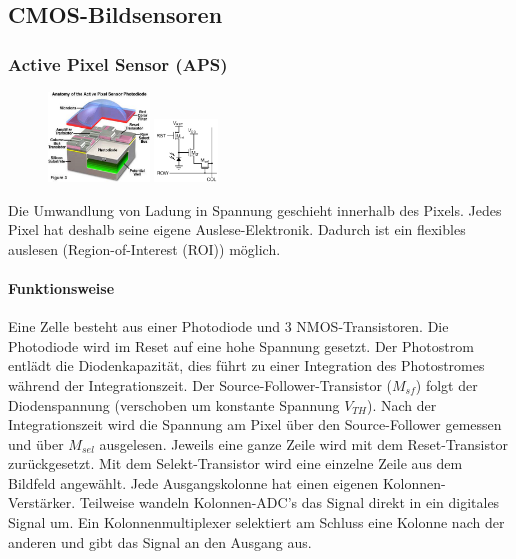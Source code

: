 \subsection{CMOS-Bildsensoren}
\subsubsection{Active Pixel Sensor (APS)}
\begin{figure}
    \centering
    \includegraphics[width=0.24\textwidth]{images/cmos_aps}
    \includegraphics[width=0.15\textwidth]{images/cmos_aps_aufbau}
\end{figure}
Die Umwandlung von Ladung in Spannung geschieht innerhalb des Pixels. Jedes Pixel hat deshalb seine eigene Auslese-Elektronik. Dadurch ist ein flexibles auslesen (Region-of-Interest (ROI)) möglich. 
\paragraph{Funktionsweise}
Eine Zelle besteht aus einer Photodiode und 3 NMOS-Transistoren. Die Photodiode wird im Reset auf eine hohe Spannung gesetzt. Der Photostrom entlädt die Diodenkapazität, dies führt zu einer Integration des Photostromes während der Integrationszeit. Der Source-Follower-Transistor ($M_{sf}$) folgt der Diodenspannung (verschoben um konstante Spannung $V_{TH}$). Nach der Integrationszeit wird die Spannung am Pixel über den Source-Follower gemessen und über $M_{sel}$ ausgelesen. Jeweils eine ganze Zeile wird mit dem Reset-Transistor zurückgesetzt. Mit dem Selekt-Transistor wird eine einzelne Zeile aus dem Bildfeld angewählt. Jede Ausgangskolonne hat einen eigenen Kolonnen-Verstärker. Teilweise wandeln Kolonnen-ADC's das Signal direkt in ein digitales Signal um. Ein Kolonnenmultiplexer selektiert am Schluss eine Kolonne nach der anderen und gibt das Signal an den Ausgang aus. \\


